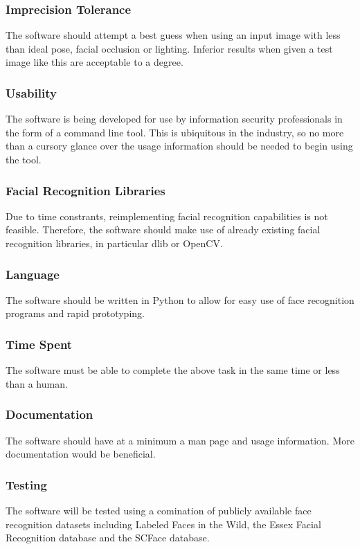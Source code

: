 \documentclass[12pt]{article}
\begin{document}
\subsubsection{Imprecision Tolerance}
The software should attempt a best guess when using an input image with less than ideal pose, facial occlusion or lighting. Inferior results when given a test image like this are acceptable to a degree.

\subsubsection{Usability}
The software is being developed for use by information security professionals in the form of a command line tool. This is ubiquitous in the industry, so no more than a cursory glance over the usage information should be needed to begin using the tool.

\subsubsection{Facial Recognition Libraries}
Due to time constrants, reimplementing facial recognition capabilities is not feasible. Therefore, the software should make use of already existing facial recognition libraries, in particular dlib or OpenCV.

\subsubsection{Language}
The software should be written in Python to allow for easy use of face recognition programs and rapid prototyping.

\subsubsection{Time Spent}
The software must be able to complete the above task in the same time or less than a human.

\subsubsection{Documentation}
The software should have at a minimum a man page and usage information. More documentation would be beneficial.

\subsubsection{Testing}
The software will be tested using a comination of publicly available face recognition datasets including Labeled Faces in the Wild, the Essex Facial Recognition database and the SCFace database.
\end{document}
